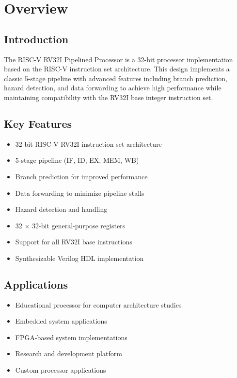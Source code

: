 \documentclass[11pt,a4paper]{article}
\begin{document}
\tableofcontents
\newpage

\section{Overview}

\subsection{Introduction}
The RISC-V RV32I Pipelined Processor is a 32-bit processor implementation based on the RISC-V instruction set architecture. This design implements a classic 5-stage pipeline with advanced features including branch prediction, hazard detection, and data forwarding to achieve high performance while maintaining compatibility with the RV32I base integer instruction set.

\subsection{Key Features}
\begin{itemize}
    \item 32-bit RISC-V RV32I instruction set architecture
    \item 5-stage pipeline (IF, ID, EX, MEM, WB)
    \item Branch prediction for improved performance
    \item Data forwarding to minimize pipeline stalls
    \item Hazard detection and handling
    \item 32 × 32-bit general-purpose registers
    \item Support for all RV32I base instructions
    \item Synthesizable Verilog HDL implementation
\end{itemize}

\subsection{Applications}
\begin{itemize}
    \item Educational processor for computer architecture studies
    \item Embedded system applications
    \item FPGA-based system implementations
    \item Research and development platform
    \item Custom processor applications
\end{itemize}
\end{document}
